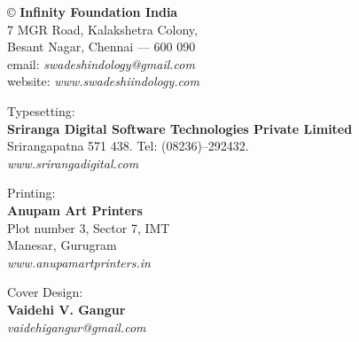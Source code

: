 \thispagestyle{empty}

© \textbf{Infinity Foundation India}\\ 7 MGR Road, Kalakshetra Colony,\\ Besant Nagar, Chennai –– 600 090\\ email: \textit{swadeshindology@gmail.com}\\ website: \textit{www.swadeshiindology.com}

Typesetting:\\\textbf{Sriranga Digital Software Technologies Private Limited}\\ Srirangapatna 571 438. Tel: (08236)–292432.\\\textit{www.srirangadigital.com}

Printing:\\\textbf{Anupam Art Printers}\\ Plot number 3, Sector 7, IMT\\ Manesar, Gurugram\\\textit{www.anupamartprinters.in}

Cover Design:\\\textbf{Vaidehi V. Gangur}\\\textit{vaidehigangur@gmail.com}


